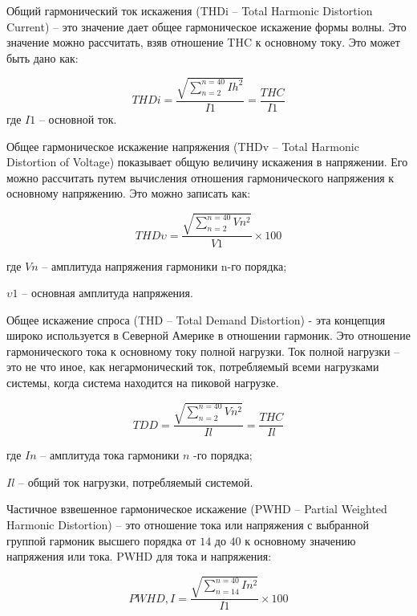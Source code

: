 Общий гармонический ток искажения (THDi – Total Harmonic Distortion Current) -- это значение дает общее гармоническое искажение формы волны. Это значение можно рассчитать, взяв отношение THC к основному току. Это может быть дано как:

\begin{equation}
	\label{eq:equation1.14}
	THDi = \frac{\sqrt{\displaystyle\sum_{n=2}^{n=40} Ih^2}}{I1} = \frac{THC}{I1}
\end{equation} 
где $I1$ – основной ток.

Общее гармоническое искажение напряжения (THDv – Total Harmonic Distortion of Voltage) показывает общую величину искажения в напряжении. Его можно рассчитать путем вычисления отношения гармонического напряжения к основному напряжению. Это можно записать как:

\begin{equation}
	\label{eq:equation1.15}
	THD\upsilon = \frac{\sqrt{\displaystyle\sum_{n=2}^{n=40} Vn^2}}{V1} \times 100 
\end{equation} 

где $Vn$ – амплитуда напряжения гармоники n-го порядка;

$\upsilon 1$ – основная амплитуда напряжения.

Общее искажение спроса (THD – Total Demand Distortion) - эта концепция широко используется в Северной Америке в отношении гармоник. Это отношение гармонического тока к основному току полной нагрузки. Ток полной нагрузки – это не что иное, как негармонический ток, потребляемый всеми нагрузками системы, когда система находится на пиковой нагрузке.

\begin{equation}
	\label{eq:equation1.16}
	TDD = \frac{\sqrt{\displaystyle\sum_{n=2}^{n=40} Vn^2}}{Il} = \frac{THC}{Il}
\end{equation} 

где $In$ – амплитуда тока гармоники $n$ -го порядка;

$Il$ – общий ток нагрузки, потребляемый системой.

Частичное взвешенное гармоническое искажение (PWHD – Partial Weighted Harmonic Distortion) -- это отношение тока или напряжения с выбранной группой гармоник высшего порядка от $14$ до $40$ к основному значению напряжения или тока. PWHD для тока и напряжения:

\begin{equation}
	\label{eq:equation1.17}
PWHD,I = \frac{\sqrt{\displaystyle\sum_{n=14}^{n=40} In^2}}{I1} \times 100 
\end{equation} 

